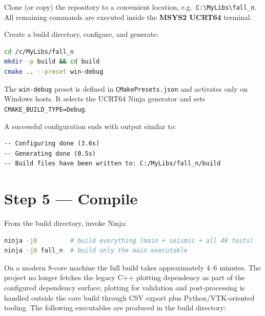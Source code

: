 Clone (or copy) the repository to a convenient location, e.g.\
\texttt{C:\textbackslash MyLibs\textbackslash fall\_n}.  All remaining
commands are executed inside the \textbf{MSYS2 UCRT64} terminal.

Create a build directory, configure, and generate:

\begin{lstlisting}[language=bash, basicstyle=\ttfamily\small,
    keywordstyle=\bfseries\color{blue!70!black},
    commentstyle=\itshape\color{green!50!black},
    stringstyle=\color{red!60!black},
    frame=single, framerule=0.4pt, rulecolor=\color{gray!50},
    breaklines=true, showstringspaces=false]
cd /c/MyLibs/fall_n
mkdir -p build && cd build
cmake .. --preset win-debug
\end{lstlisting}

The \texttt{win-debug} preset is defined in \texttt{CMakePresets.json} and
activates only on Windows hosts.  It selects the UCRT64 Ninja generator and
sets \texttt{CMAKE\_BUILD\_TYPE=Debug}.

A successful configuration ends with output similar to:
\begin{lstlisting}[basicstyle=\ttfamily\small, frame=single,
    framerule=0.4pt, rulecolor=\color{gray!50}, breaklines=true,
    showstringspaces=false]
-- Configuring done (3.6s)
-- Generating done (0.5s)
-- Build files have been written to: C:/MyLibs/fall_n/build
\end{lstlisting}

\section{Step 5 — Compile}
\label{sec:win-build}

From the build directory, invoke Ninja:

\begin{lstlisting}[language=bash, basicstyle=\ttfamily\small,
    keywordstyle=\bfseries\color{blue!70!black},
    commentstyle=\itshape\color{green!50!black},
    stringstyle=\color{red!60!black},
    frame=single, framerule=0.4pt, rulecolor=\color{gray!50},
    breaklines=true, showstringspaces=false]
ninja -j8         # build everything (main + seismic + all 48 tests)
ninja -j8 fall_n  # build only the main executable
\end{lstlisting}

On a modern 8-core machine the full build takes approximately 4--6 minutes.
The project no longer fetches the legacy C++ plotting dependency as part of
the configured dependency surface; plotting for validation and post-processing
is handled outside the core build through CSV export plus Python/VTK-oriented
tooling.
The following executables are produced in the build directory:

